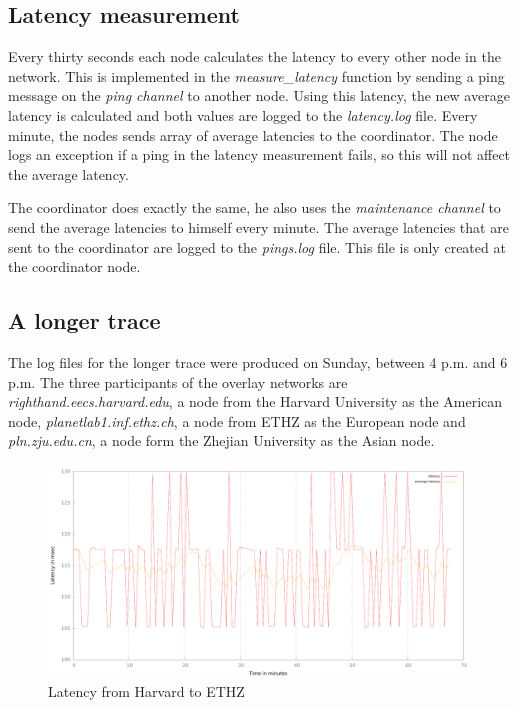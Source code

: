 \documentclass[paper=a4, fontsize=11pt]{scrartcl} %
\numberwithin{equation}{section} %
\numberwithin{figure}{section} %
\numberwithin{table}{section} %
\begin{document}

\subsection{Latency measurement}

Every thirty seconds each node calculates the latency to every other node in the network. This is implemented in the \textit{measure\_latency} function by sending a ping message on the \textit{ping channel} to another node. Using this latency, the new average latency is calculated and both values are logged to the \textit{latency.log} file. Every minute, the nodes sends array of average latencies to the coordinator. The node logs an exception if a ping in the latency measurement fails, so this will not affect the average latency.

The coordinator does exactly the same, he also uses the \textit{maintenance channel} to send the average latencies to himself every minute. The average latencies that are sent to the coordinator are logged to the \textit{pings.log} file. This file is only created at the coordinator node.

\subsection{A longer trace}

The log files for the longer trace were produced on Sunday, between 4 p.m. and 6 p.m. The three participants of the overlay networks are \textit{righthand.eecs.harvard.edu}, a node from the Harvard University as the American node, \textit{planetlab1.inf.ethz.ch}, a node from ETHZ as the European node and \textit{pln.zju.edu.cn}, a node form the Zhejian University as the Asian node.

\begin{figure}[h!]
\includegraphics[width=\columnwidth]{latency_harvard_ethz.pdf}
\caption{Latency from Harvard to ETHZ}
\end{figure}
\end{document}
